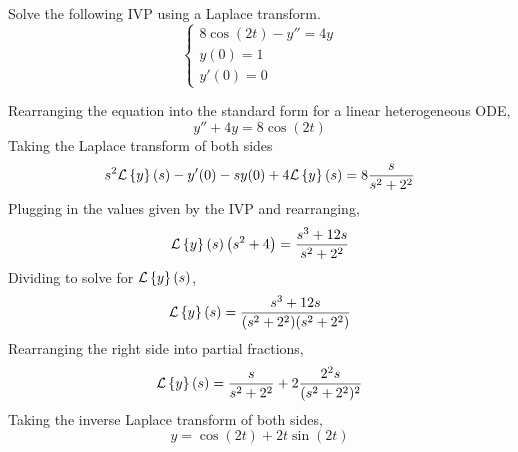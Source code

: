 \begin{example}
	Solve the following IVP using a Laplace transform.
	\begin{equation*}
		\begin{cases}
			8\cos{(2t)} - y'' = 4y\\
			y(0) = 1\\
			y'(0) = 0
		\end{cases}
	\end{equation*}
\end{example}
\noindent
Rearranging the equation into the standard form for a linear heterogeneous ODE,
\begin{equation*}
	y'' + 4y = 8\cos{(2t)}
\end{equation*}
Taking the Laplace transform of both sides
\begin{equation*}
	s^2\mathcal{L}\left\{ y \right\}\left(s\right) - y'(0) - sy(0) + 4\mathcal{L}\left\{ y \right\}\left(s\right) = 8\frac{s}{s^2 + 2^2}
\end{equation*}
Plugging in the values given by the IVP and rearranging,
\begin{equation*}
	\mathcal{L}\left\{ y \right\}\left(s\right)\left(s^2 + 4\right) = \frac{s^3 + 12s}{s^2 + 2^2}
\end{equation*}
Dividing to solve for $\mathcal{L}\left\{ y \right\}\left(s\right)$,
\begin{equation*}
	\mathcal{L}\left\{ y \right\}\left(s\right) = \frac{s^3 + 12s}{(s^2 + 2^2)(s^2 + 2^2)}
\end{equation*}
Rearranging the right side into partial fractions,
\begin{equation*}
	\mathcal{L}\left\{ y \right\}\left(s\right) = \frac{s}{s^2 + 2^2} + 2\frac{2^2s}{(s^2+2^2)^2}
\end{equation*}
Taking the inverse Laplace transform of both sides,
\begin{equation*}
	y = \cos{(2t)} + 2t\sin{(2t)}
\end{equation*}